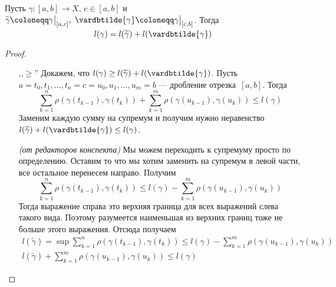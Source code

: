 \begin{theorem}
  Пусть $\gamma\colon [a, b] \to X, \, c \in [a, b]$ и $\widetilde{\gamma} \coloneqq \gamma\smash{\big |_{[a, c]}}, \; \vardbtilde{\gamma} \coloneqq \gamma \smash{\big|_{[c, b]}}$.
  Тогда
  \begin{equation*}
    l(\gamma) = l(\widetilde{\gamma}) + l(\vardbtilde{\gamma})
  \end{equation*}
\end{theorem}
\begin{proof}
  \begin{enumerate}
    \item[]
    \item[,,$\geq$''] Докажем, что $l(\gamma) \geq l(\widetilde{\gamma}) + l(\vardbtilde{\gamma})$. Пусть $a = t_0, t_1, \dotsc, t_n = c = u_0, u_1, \dots, u_m = b$ --- дробление отрезка~$[a, b]$. Тогда
    \begin{equation*}
      \sum\limits_{k = 1}^{n} \rho(\gamma(t_{k - 1}), \gamma(t_{k})) +
      \sum\limits_{k = 1}^{m} \rho(\gamma(u_{k - 1}), \gamma(u_{k})) \leq l(\gamma)
    \end{equation*}
    Заменим каждую сумму на супремум и получим нужно неравенство $ l(\widetilde{\gamma}) + l(\vardbtilde{\gamma}) \leq l(\gamma)$.
    \begin{notice}
      \textit{(от редакторов конспекта)} Мы можем переходить к супремуму просто по определению. Оставим то что мы хотим заменить на супремум в левой части, все остальное перенесем направо. Получим
      \begin{equation*}
      \sum\limits_{k = 1}^{n} \rho(\gamma(t_{k - 1}), \gamma(t_{k})) \leq l(\gamma) -
      \sum\limits_{k = 1}^{m} \rho(\gamma(u_{k - 1}), \gamma(u_{k}))
      \end{equation*}
      Тогда выражение справа это верхняя граница для всех выражений слева такого вида. Поэтому разумеется наименьшая из верхних границ тоже не больше этого выражения. Отсюда получаем
      \begin{equation*}
        \begin{gathered}
            l(\widetilde{\gamma}) = \sup \sum\limits_{k = 1}^{n} \rho(\gamma(t_{k - 1}), \gamma(t_{k})) \leq l(\gamma) -
            \sum\limits_{k = 1}^{m} \rho(\gamma(u_{k - 1}), \gamma(u_{k})) \\
            l(\widetilde{\gamma}) +
            \sum\limits_{k = 1}^{m} \rho(\gamma(u_{k - 1}), \gamma(u_{k})) \leq l(\gamma)
        \end{gathered}
      \end{equation*}

\end{notice}
\end{enumerate}
\end{proof}
